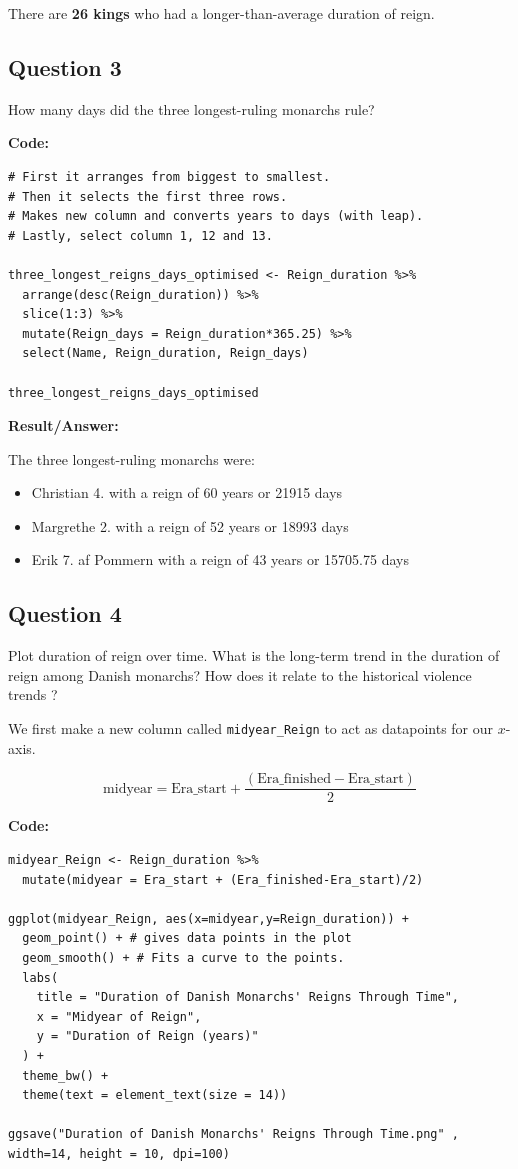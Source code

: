 \documentclass[%
  final,  %
  12pt,  %
  british,
  a4paper
]{article}
\begin{document}
\noindent There are \textbf{26 kings} who had a longer-than-average duration of reign.

\subsection*{Question 3}
How many days did the three longest-ruling monarchs rule?

\textbf{Code:}

\begin{lstlisting}
# First it arranges from biggest to smallest.
# Then it selects the first three rows.
# Makes new column and converts years to days (with leap).
# Lastly, select column 1, 12 and 13.

three_longest_reigns_days_optimised <- Reign_duration %>%
  arrange(desc(Reign_duration)) %>%
  slice(1:3) %>%
  mutate(Reign_days = Reign_duration*365.25) %>% 
  select(Name, Reign_duration, Reign_days)

three_longest_reigns_days_optimised
\end{lstlisting}

\textbf{Result/Answer:}

\noindent The three longest-ruling monarchs were:
\begin{itemize}
    \item Christian 4. with a reign of 60 years or 21915 days
    \item Margrethe 2. with a reign of 52 years or 18993 days
    \item Erik 7. af Pommern with a reign of 43 years or 15705.75 days
\end{itemize}

\subsection*{Question 4}
Plot duration of reign over time. What is the long-term trend in the duration of reign among Danish monarchs? How does it relate to the historical violence trends ? 

We first make a new column called \verb|midyear_Reign| to act as datapoints for our $x$-axis.

$$\text{midyear}=\text{Era\_start} + \frac{(\text{Era\_finished}-\text{Era\_start})}{2}$$

\clearpage
\textbf{Code:}
\begin{lstlisting}
midyear_Reign <- Reign_duration %>% 
  mutate(midyear = Era_start + (Era_finished-Era_start)/2)

ggplot(midyear_Reign, aes(x=midyear,y=Reign_duration)) +
  geom_point() + # gives data points in the plot
  geom_smooth() + # Fits a curve to the points.
  labs(
    title = "Duration of Danish Monarchs' Reigns Through Time",
    x = "Midyear of Reign",
    y = "Duration of Reign (years)"
  ) +
  theme_bw() +
  theme(text = element_text(size = 14))

ggsave("Duration of Danish Monarchs' Reigns Through Time.png" , width=14, height = 10, dpi=100)
\end{lstlisting}
\end{document}
